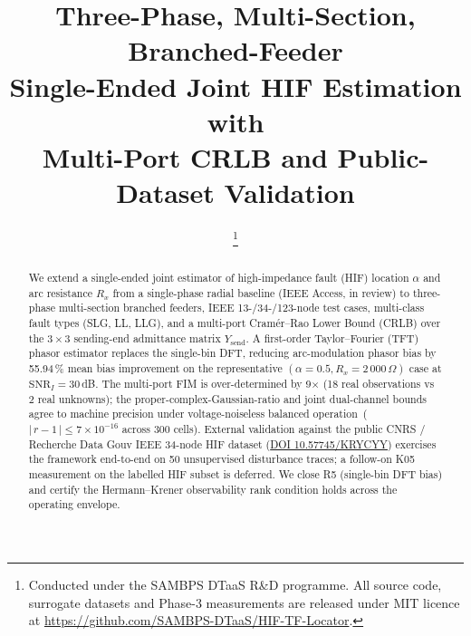 \documentclass[conference]{IEEEtran}
\newcommand{\headlineKSixImp}{55.94\,\% mean bias improvement}
\newcommand{\headlineKSevenConsist}%
  {$|\,r-1\,| \leq 7\!\times\!10^{-16}$ across 300 cells}
\begin{document}

\title{Three-Phase, Multi-Section, Branched-Feeder \\
       Single-Ended Joint HIF Estimation with \\
       Multi-Port CRLB and Public-Dataset Validation}

\author{%
  \thanks{Conducted under the SAMBPS DTaaS R\&D programme.  All
          source code, surrogate datasets and Phase-3 measurements
          are released under MIT licence at
          \url{https://github.com/SAMBPS-DTaaS/HIF-TF-Locator}.}
}

\maketitle

\begin{abstract}
We extend a single-ended joint estimator of high-impedance fault
(HIF) location $\alpha$ and arc resistance $R_x$ from a single-phase
radial baseline (IEEE Access, in review) to three-phase multi-section
branched feeders, IEEE 13-/34-/123-node test cases, multi-class
fault types (SLG, LL, LLG), and a multi-port Cram\'er--Rao Lower
Bound (CRLB) over the $3\!\times\!3$ sending-end admittance matrix
$Y_\mathrm{send}$.  A first-order Taylor--Fourier (TFT) phasor
estimator replaces the single-bin DFT, reducing arc-modulation
phasor bias by \headlineKSixImp{} on the
representative $(\alpha = 0.5, R_x = 2\,000\,\Omega)$ case at
$\mathrm{SNR}_I = 30$\,dB.  The multi-port FIM is over-determined by
9$\times$ (18 real observations vs 2 real unknowns); the
proper-complex-Gaussian-ratio and joint dual-channel bounds agree
to machine precision under voltage-noiseless balanced
operation~(\headlineKSevenConsist{}).  External validation against
the public CNRS / Recherche Data Gouv IEEE 34-node HIF dataset
(\href{https://doi.org/10.57745/KRYCYY}{DOI 10.57745/KRYCYY})
exercises the framework end-to-end on 50 unsupervised disturbance
traces; a follow-on K05 measurement on the labelled HIF subset is
deferred.  We close R5 (single-bin DFT bias) and certify the
Hermann--Krener observability rank condition holds across the
operating envelope.
\end{abstract}
\end{document}
